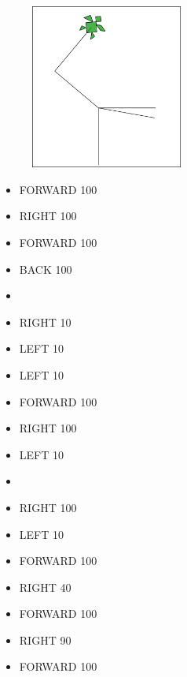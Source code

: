 \begin{minipage}{0.5\textwidth}
\begin{figure}[H]
   \includegraphics[width=5.0cm]{./images/papert-2/pap-2-2.png}
   \label{pap-2-2}
\end{figure}
\end{minipage} \hfill
\begin{minipage}{0.45\textwidth}
\begin{itemize}[itemsep=-3pt,parsep=2pt]
\item[] \hspace{0.5cm} FORWARD 100
\item[] \hspace{0.5cm} RIGHT 100
\item[] \hspace{0.5cm} FORWARD 100
\item[] \hspace{0.5cm} BACK 100
\item[] \hspace{0.5cm} 
\item[] \hspace{0.5cm} RIGHT 10
\item[] \hspace{0.5cm} LEFT 10
\item[] \hspace{0.5cm} LEFT 10
\item[] \hspace{0.5cm} FORWARD 100
\item[] \hspace{0.5cm} RIGHT 100
\item[] \hspace{0.5cm} LEFT 10
\item[] \hspace{0.5cm} 
\item[] \hspace{0.5cm} RIGHT 100
\item[] \hspace{0.5cm} LEFT 10
\item[] \hspace{0.5cm} FORWARD 100
\item[] \hspace{0.5cm} RIGHT 40
\item[] \hspace{0.5cm} FORWARD 100
\item[] \hspace{0.5cm} RIGHT 90
\item[] \hspace{0.5cm} FORWARD 100
\end{itemize}
\end{minipage}

